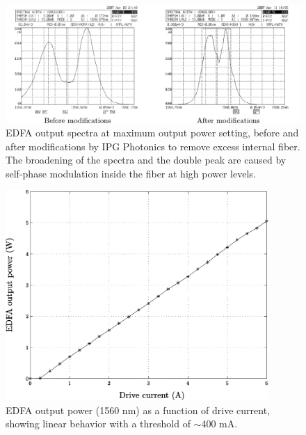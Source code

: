 \begin{figure}[h]
\begin{center}
\includegraphics[width=16cm]{figure-pcoct-edfabeforeafter.pdf}
\caption{EDFA output spectra at maximum output power setting, before and after modifications by IPG Photonics to remove excess internal fiber. The broadening of the spectra and the double peak are caused by self-phase modulation inside the fiber at high power levels.}
\label{figure:pcoct-edfabeforeafter}
\end{center}
\end{figure}

\begin{figure}[h]
\begin{center}
\includegraphics[width=10cm]{figure-pcoct-edfapower.pdf}
\caption{EDFA output power (1560 nm) as a function of drive current, showing linear behavior with a threshold of $\sim$400 mA.}
\label{figure:pcoct-edfapower}
\end{center}
\end{figure}

